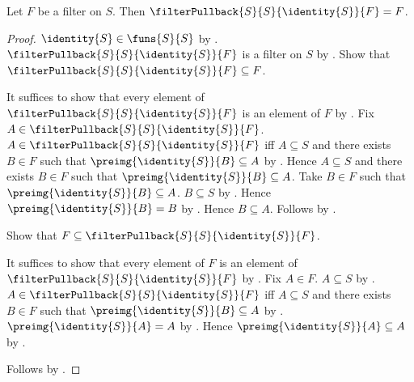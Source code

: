 \begin{theorem}\label{identity_filter_pullback}
    Let $F$ be a filter on $S$.
    Then $\filterPullback{S}{S}{\identity{S}}{F}=F$.
\end{theorem}
\begin{proof}
    $\identity{S}\in\funs{S}{S}$ by .
    $\filterPullback{S}{S}{\identity{S}}{F}$ is a filter on $S$ by
        .
    Show that $\filterPullback{S}{S}{\identity{S}}{F}\subseteq F$.
    \begin{subproof}
        It suffices to show that every element of
            $\filterPullback{S}{S}{\identity{S}}{F}$ is an element of $F$
            by .
        Fix $A\in\filterPullback{S}{S}{\identity{S}}{F}$.
        $A\in\filterPullback{S}{S}{\identity{S}}{F}$ iff
            $A\subseteq S$ and there exists $B\in F$ such that
            $\preimg{\identity{S}}{B}\subseteq A$ by
            .
        Hence $A\subseteq S$ and there exists $B\in F$ such that
            $\preimg{\identity{S}}{B}\subseteq A$.
        Take $B\in F$ such that $\preimg{\identity{S}}{B}\subseteq A$.
        $B\subseteq S$ by .
        Hence $\preimg{\identity{S}}{B}=B$ by
            .
        Hence $B\subseteq A$.
        Follows by .
    \end{subproof}
    Show that $F\subseteq\filterPullback{S}{S}{\identity{S}}{F}$.
    \begin{subproof}
        It suffices to show that every element of $F$ is an element of
            $\filterPullback{S}{S}{\identity{S}}{F}$ by .
        Fix $A\in F$.
        $A\subseteq S$ by .
        $A\in\filterPullback{S}{S}{\identity{S}}{F}$ iff
            $A\subseteq S$ and there exists $B\in F$ such that
            $\preimg{\identity{S}}{B}\subseteq A$ by
            .
        $\preimg{\identity{S}}{A}=A$ by
            .
        Hence $\preimg{\identity{S}}{A}\subseteq A$ by
            .
    \end{subproof}
    Follows by .
\end{proof}

